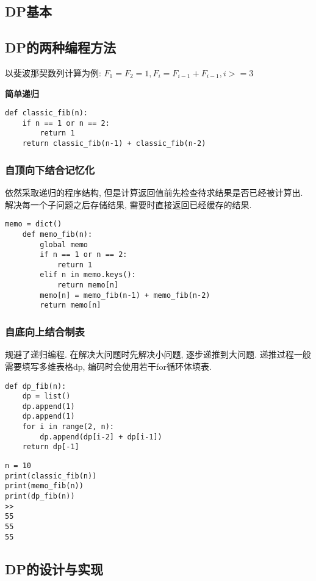 \documentclass[../main]{subfiles}
\begin{document}
\begin{sloppy}


\section{DP基本}

\subsection{DP的两种编程方法}

以斐波那契数列计算为例: $F_1 = F_2 = 1, F_i = F_{i-1} + F_{i-1}, i >= 3$

\textbf{简单递归}

\begin{lstlisting}[style = Python]
def classic_fib(n):
    if n == 1 or n == 2:
        return 1
    return classic_fib(n-1) + classic_fib(n-2)
\end{lstlisting}

\subsubsection{自顶向下结合记忆化}

依然采取递归的程序结构, 但是计算返回值前先检查待求结果是否已经被计算出. 解决每一个子问题之后存储结果, 需要时直接返回已经缓存的结果.

\begin{lstlisting}[style = Python]
memo = dict()
    def memo_fib(n):
        global memo
        if n == 1 or n == 2:
            return 1
        elif n in memo.keys():
            return memo[n]
        memo[n] = memo_fib(n-1) + memo_fib(n-2)
        return memo[n]
\end{lstlisting}

\subsubsection{自底向上结合制表}

规避了递归编程. 在解决大问题时先解决小问题, 逐步递推到大问题. 递推过程一般需要填写多维表格dp, 编码时会使用若干for循环体填表.

\begin{lstlisting}[style = Python]
def dp_fib(n):
    dp = list()
    dp.append(1)
    dp.append(1)
    for i in range(2, n):
        dp.append(dp[i-2] + dp[i-1])
    return dp[-1]
\end{lstlisting}

\begin{verbatim}
n = 10
print(classic_fib(n))
print(memo_fib(n))
print(dp_fib(n))
>>
55
55
55
\end{verbatim}

\newpage
\subsection{DP的设计与实现}







\end{sloppy}
\end{document}
